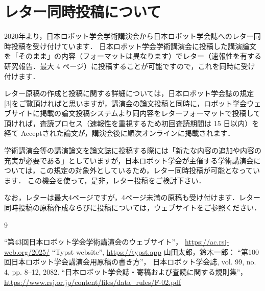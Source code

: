 \documentclass[twocolumn]{jarticle} %
\begin{document}
\section{レター同時投稿について}
2020年より，日本ロボット学会学術講演会から日本ロボット学会誌へのレター同時投稿を受け付けています．
日本ロボット学会学術講演会に投稿した講演論文を「そのまま」の内容（フォーマットは異なります）でレター（速報性を有する研究報告．最大 4 ページ）に投稿することが可能ですので，これを同時に受け付けます． 

レター原稿の作成と投稿に関する詳細については，日本ロボット学会誌の規定[3]をご覧頂ければと思いますが，講演会の論文投稿と同時に，ロボット学会ウェブサイトに掲載の論文投稿システムより同内容をレターフォーマットで投稿して頂ければ，査読プロセス（速報性を重視するため初回査読期間は 15 日以内）を経て Acceptされた論文が，講演会後に順次オンラインに掲載されます．

学術講演会等の講演論文を論文誌に投稿する際には「新たな内容の追加や内容の充実が必要である」としていますが，日本ロボット学会が主催する学術講演会については，この規定の対象外としているため，レター同時投稿が可能となっています．
この機会を使って，是非，レター投稿をご検討下さい．

なお，レターは最大4ページですが，4ページ未満の原稿も受け付けます．レター同時投稿の原稿作成ならびに投稿については，ウェブサイト\cite{website}をご参照ください．



\small
\begin{thebibliography}{9}

``第43回日本ロボット学会学術講演会のウェブサイト''，
  \url{https://ac.rsj-web.org/2025/}
  ``Typst website'',
  \url{https://typst.app}
  山田太郎，鈴木一郎：
  ``第100回日本ロボット学会講演会用原稿の書き方''，
  日本ロボット学会誌, vol. 99, no. 4, pp. 8--12, 2082.
  ``日本ロボット学会誌・寄稿および査読に関する規則集''，
  \url{https://www.rsj.or.jp/content/files/data_rules/F-02.pdf}
\end{thebibliography}
\end{document}
